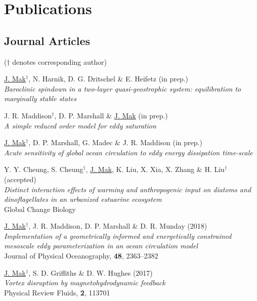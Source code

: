 \documentclass[letterpaper]{article}
\renewenvironment{itemize}{
  \begin{list}{}{
    \setlength{\leftmargin}{1.5em}
  }
}{
  \end{list}
}
\begin{document}
\section*{Publications}
\subsection*{Journal Articles}

($\dagger$ denotes corresponding author)

\begin{itemize}

\item[*] \underline{J. Mak}$^{\dagger}$, N. Harnik, D. G. Dritschel \& E. Heifetz
(in prep.)\\
\textit{Baroclinic spindown in a two-layer quasi-geostrophic system:
equilibration to marginally stable states}

\item[*] J. R. Maddison$^{\dagger}$, D. P. Marshall \& \underline{J. Mak} (in prep.)\\
\textit{A simple reduced order model for eddy saturation}

\item[*] \underline{J. Mak}$^{\dagger}$, D. P. Marshall, G. Madec \& J. R. Maddison
(in prep.)\\
\textit{Acute sensitivity of global ocean circulation to eddy energy dissipation time-scale}

\item[*] Y. Y. Cheung, S. Cheung$^{\dagger}$, \underline{J. Mak}, K. Liu, X. Xia, X. Zhang \& H. Liu$^{\dagger}$ (accepted)\\
\textit{Distinct interaction effects of warming and anthropogenic input on
diatoms and dinoflagellates in an urbanized estuarine ecosystem}\\
Global Change Biology

\item[9.] \underline{J. Mak}$^{\dagger}$, J. R. Maddison, D. P. Marshall \& D. R. Munday
(2018)\\
\textit{Implementation of a geometrically informed and energetically constrained
mesoscale eddy parameterization in an ocean circulation model}\\
Journal of Physical Oceanography, \textbf{48}, 2363--2382

\item[8.] \underline{J. Mak}$^{\dagger}$, S. D. Griffiths \& D. W. Hughes
(2017)\\
\textit{Vortex disruption by magnetohydrodynamic feedback}\\
Physical Review Fluids, \textbf{2}, 113701


\end{itemize}
\end{document}
